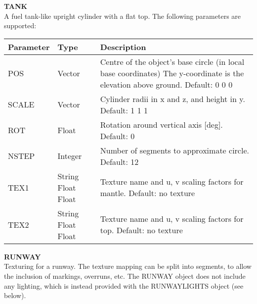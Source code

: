 \documentclass[Orbiter Developer Manual.tex]{subfiles}
\begin{document}
\noindent
\textbf{TANK}\\
A fuel tank-like upright cylinder with a flat top. The following parameters are supported:

	\begin{longtable}{ |p{}|p{}|p{}| }
	\hline\rule{0pt}{2ex}
	\textbf{Parameter} & \textbf{Type} & \textbf{Description}\\
	\hline\rule{0pt}{2ex}
	POS & Vector & Centre of the object’s base circle (in local base coordinates) The y-coordinate is the elevation above ground. Default: 0 0 0\\
	\hline\rule{0pt}{2ex}
	SCALE & Vector & Cylinder radii in x and z, and height in y. Default: 1 1 1\\
	\hline\rule{0pt}{2ex}
	ROT & Float & Rotation around vertical axis [deg]. Default: 0\\
	\hline\rule{0pt}{2ex}
	NSTEP & Integer & Number of segments to approximate circle. Default: 12\\
	\hline\rule{0pt}{2ex}
	TEX1 & String Float Float & Texture name and u, v scaling factors for mantle. Default: no texture\\
	\hline\rule{0pt}{2ex}
	TEX2 & String Float Float & Texture name and u, v scaling factors for top. Default: no texture\\
	\hline
	\end{longtable}

\noindent
\textbf{RUNWAY}\\
Texturing for a runway. The texture mapping can be split into segments, to allow the inclusion of markings, overruns, etc. The RUNWAY object does not include any lighting, which is instead provided with the RUNWAYLIGHTS object (see below).
\end{document}
